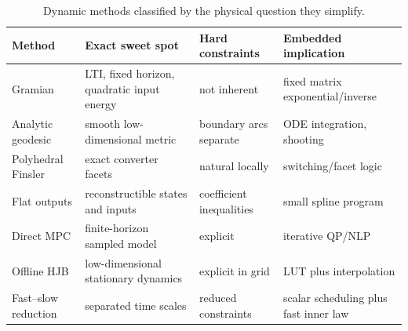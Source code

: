 \begin{table}[tb]
\centering
\caption{Dynamic methods classified by the physical question they simplify.}
\label{tab:dynamic-methods}
\begin{tabularx}{\linewidth}{@{}lXXX@{}}
\toprule
Method & Exact sweet spot & Hard constraints & Embedded implication\\
\midrule
Gramian & LTI, fixed horizon, quadratic input energy & not inherent & fixed matrix exponential/inverse\\
Analytic geodesic & smooth low-dimensional metric & boundary arcs separate & ODE integration, shooting\\
Polyhedral Finsler & exact converter facets & natural locally & switching/facet logic\\
Flat outputs & reconstructible states and inputs & coefficient inequalities & small spline program\\
Direct MPC & finite-horizon sampled model & explicit & iterative QP/NLP\\
Offline HJB & low-dimensional stationary dynamics & explicit in grid & LUT plus interpolation\\
Fast--slow reduction & separated time scales & reduced constraints & scalar scheduling plus fast inner law\\
\bottomrule
\end{tabularx}
\end{table}

